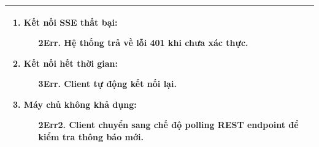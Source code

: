 {\begin{tabularx}{\textwidth}{|>{\raggedright\arraybackslash}X|>{\raggedright\arraybackslash}X|}
\begin{enumerate}
    \item \textbf{Kết nối SSE thất bại:}
    \begin{enumerate}
        \item[2Err.] Hệ thống trả về lỗi 401 khi chưa xác thực.
    \end{enumerate}
    \item \textbf{Kết nối hết thời gian:}
    \begin{enumerate}
        \item[3Err.] Client tự động kết nối lại.
    \end{enumerate}
    \item \textbf{Máy chủ không khả dụng:}
    \begin{enumerate}
        \item[2Err2.] Client chuyển sang chế độ polling REST endpoint để kiểm tra thông báo mới.
    \end{enumerate}
\end{enumerate} \\
\hline
\end{tabularx}
}
